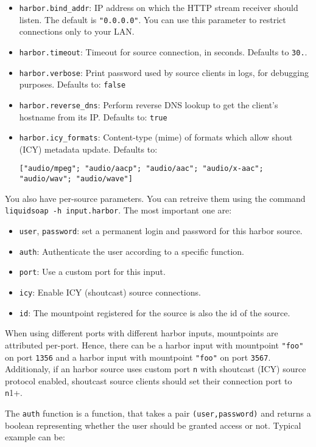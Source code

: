 \begin{itemize}
\item \verb+harbor.bind_addr+: IP address on which the HTTP stream receiver should listen. The default is \verb+"0.0.0.0"+. You can use this parameter to restrict connections only to your LAN.
\item \verb+harbor.timeout+: Timeout for source connection, in seconds. Defaults to \verb+30.+.
\item \verb+harbor.verbose+: Print password used by source clients in logs, for debugging purposes. Defaults to: \verb+false+
\item \verb+harbor.reverse_dns+: Perform reverse DNS lookup to get the client's hostname from its IP. Defaults to: \verb+true+
\item \verb+harbor.icy_formats+: Content-type (mime) of formats which allow shout (ICY) metadata update. Defaults to:
\begin{verbatim}
["audio/mpeg"; "audio/aacp"; "audio/aac"; "audio/x-aac"; "audio/wav"; "audio/wave"]
\end{verbatim}


\end{itemize}
You also have per-source parameters. You can retreive them using the command 
\verb+liquidsoap -h input.harbor+. The most important one are:

\begin{itemize}
\item \verb+user+, \verb+password+: set a permanent login and password for this harbor source.
\item \verb+auth+: Authenticate the user according to a specific function.
\item \verb+port+: Use a custom port for this input.
\item \verb+icy+: Enable ICY (shoutcast) source connections.
\item \verb+id+: The mountpoint registered for the source is also the id of the source.

\end{itemize}
When using different ports with different harbor inputs, mountpoints are attributed
per-port. Hence, there can be a harbor input with mountpoint \verb+"foo"+ on port \verb+1356+
and a harbor input with mountpoint \verb+"foo"+ on port \verb+3567+. Additionaly, if an harbor 
source uses custom port \verb+n+ with shoutcast (ICY) source protocol enabled, shoutcast
source clients should set their connection port to \verb+n+1+.

The \verb+auth+ function is a function, that takes a pair \verb+(user,password)+ and returns a boolean representing whether the user 
should be granted access or not. Typical example can be:

